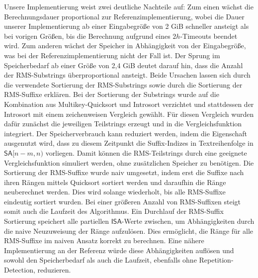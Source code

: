 Unsere Implementierung weist zwei deutliche Nachteile auf: Zum einen wächst die Berechnungsdauer proportional zur Referenzimplementierung, wobei die Dauer unserer Implementierung ab einer Eingabegröße von 2 GiB schneller ansteigt als bei vorigen Größen, bis die Berechnung aufgrund eines $2h$-Timeouts beendet wird. Zum anderen wächst der Speicher in Abhängigkeit von der Eingabegröße, was bei der Referenzimplementierung nicht der Fall ist. Der Sprung im Speicherbedarf ab einer Größe von 2,4 GiB deutet darauf hin, dass die Anzahl der RMS-Substrings überproportional ansteigt. Beide Ursachen lassen sich durch die verwendete Sortierung der RMS-Substrings sowie durch die Sortierung der RMS-Suffixe erklären. Bei der Sortierung der Substrings wurde auf die Kombination aus Multikey-Quicksort und Introsort verzichtet und stattdessen der Introsort mit einem zeichenweisen Vergleich gewählt. Für diesen Vergleich wurden dafür zunächst die jeweiligen Teilstrings erzeugt und in die Vergleichsfunktion integriert. Der Speicherverbrauch kann reduziert werden, indem die Eigenschaft ausgenutzt wird, dass zu diesem Zeitpunkt die Suffix-Indizes in Textreihenfolge in $\mathsf{SA}[n-m, n)$ vorliegen. Damit können die RMS-Teilstrings durch eine geeignete Vergleichsfunktion simuliert werden, ohne zusätzlichen Speicher zu benötigen.
Die Sortierung der RMS-Suffixe wurde naiv umgesetzt, indem erst die Suffixe nach ihren Rängen mittels Quicksort sortiert werden und daraufhin die Ränge neuberechnet werden. Dies wird solange wiederholt, bis alle RMS-Suffixe eindeutig sortiert wurden. Bei einer größeren Anzahl von RMS-Suffixen steigt somit auch die Laufzeit des Algorithmus. Ein Durchlauf der RMS-Suffix Sortierung speichert alle partiellen $\mathsf{ISA}$-Werte zwischen, um Abhängigkeiten durch die naive Neuzuweisung der Ränge aufzulösen. Dies ermöglicht, die Ränge für alle RMS-Suffixe im naiven Ansatz korrekt zu berechnen. Eine nähere Implementierung an der Referenz würde diese Abhängigkeiten auflösen und sowohl den Speicherbedarf als auch die Laufzeit, ebenfalls ohne Repetition-Detection, reduzieren.
